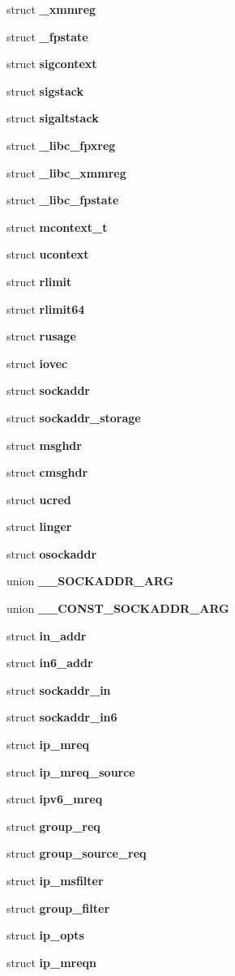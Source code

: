 \begin{DoxyCompactItemize}
struct {\bf \_\-xmmreg}
\item 
struct {\bf \_\-fpstate}
\item 
struct {\bf sigcontext}
\item 
struct {\bf sigstack}
\item 
struct {\bf sigaltstack}
\item 
struct {\bf \_\-libc\_\-fpxreg}
\item 
struct {\bf \_\-libc\_\-xmmreg}
\item 
struct {\bf \_\-libc\_\-fpstate}
\item 
struct {\bf mcontext\_\-t}
\item 
struct {\bf ucontext}
\item 
struct {\bf rlimit}
\item 
struct {\bf rlimit64}
\item 
struct {\bf rusage}
\item 
struct {\bf iovec}
\item 
struct {\bf sockaddr}
\item 
struct {\bf sockaddr\_\-storage}
\item 
struct {\bf msghdr}
\item 
struct {\bf cmsghdr}
\item 
struct {\bf ucred}
\item 
struct {\bf linger}
\item 
struct {\bf osockaddr}
\item 
union {\bf \_\-\_\-SOCKADDR\_\-ARG}
\item 
union {\bf \_\-\_\-CONST\_\-SOCKADDR\_\-ARG}
\item 
struct {\bf in\_\-addr}
\item 
struct {\bf in6\_\-addr}
\item 
struct {\bf sockaddr\_\-in}
\item 
struct {\bf sockaddr\_\-in6}
\item 
struct {\bf ip\_\-mreq}
\item 
struct {\bf ip\_\-mreq\_\-source}
\item 
struct {\bf ipv6\_\-mreq}
\item 
struct {\bf group\_\-req}
\item 
struct {\bf group\_\-source\_\-req}
\item 
struct {\bf ip\_\-msfilter}
\item 
struct {\bf group\_\-filter}
\item 
struct {\bf ip\_\-opts}
\item 
struct {\bf ip\_\-mreqn}
\item 

\end{DoxyCompactItemize}
